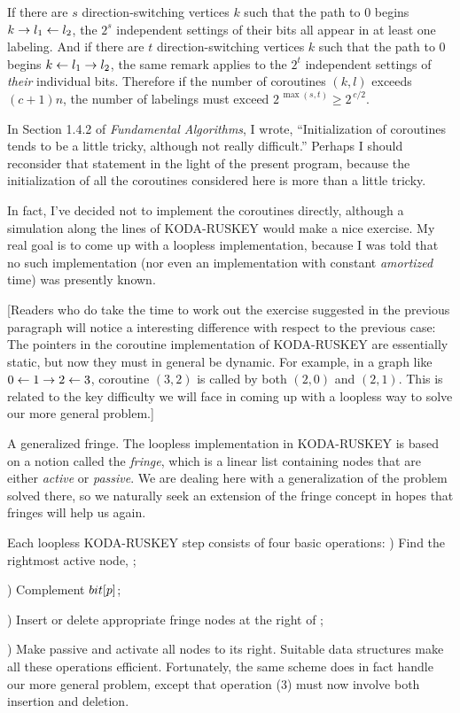 If there are $s$ direction-switching vertices $k$ such that the path to 0
begins $k\to l_1\gets l_2$, the $2^s$ independent settings of their bits all
appear in at least one labeling.
And if there are $t$ direction-switching vertices $k$ such that the path to 0
begins $k\gets l_1\to l_2$, the same remark applies to the $2^t$ independent
settings of {\it their\/} individual bits.
Therefore if the number of coroutines $(k,l)$ exceeds $(c+1)n$, the
number of labelings must exceed $2^{\,\max(s,t)}\ge2^{\,c/2}$.

\fi

In Section 1.4.2 of {\sl Fundamental Algorithms}, I
wrote,
``Initialization of coroutines tends
to be a little tricky, although not really difficult.''
Perhaps I should reconsider that statement in the light of the present
program, because the initialization of all the coroutines considered
here is more than a little tricky.

In fact, I've decided not to implement the coroutines directly,
although a simulation along the lines of {\mc KODA-RUSKEY} would
make a nice exercise. My real goal is to come up with a loopless
implementation, because I was told that no such implementation
(nor even an implementation with constant {\it amortized\/} time)
was presently known.

[Readers who do take the time to work out the exercise suggested in the
previous paragraph will notice a interesting difference with respect to
the previous case: The  pointers in
the coroutine implementation of {\mc KODA-RUSKEY} are essentially
static, but now they must in general be dynamic. For example,
in a graph like $0\gets1\to2\gets3$, coroutine $(3,2)$ is called
by both $(2,0)$ and $(2,1)$. This is related to the key difficulty
we will face in coming up with a loopless way to solve our
more general problem.]

\fi

A generalized fringe. The loopless implementation in
{\mc KODA-RUSKEY}
is based on a notion called the {\it fringe}, which is a linear list
containing nodes that are either {\it active\/} or {\it passive}.
We are dealing here with a generalization of the problem solved there,
so we naturally seek an extension of the fringe concept in hopes that
fringes will help us again.

Each loopless {\mc KODA-RUSKEY} step consists of four basic operations:
\smallskip
\indent{}) Find the rightmost active node, ;\par
\indent{}) Complement $\\{bit}[p]$;\par
\indent{}) Insert or delete appropriate
fringe nodes at the right of ;\par
\indent{}) Make  passive and activate all nodes to its right.
\smallskip\noindent
Suitable data structures make all these operations efficient.
Fortunately, the same scheme does in fact handle our more general problem,
except that operation (3) must now involve both insertion and deletion.

